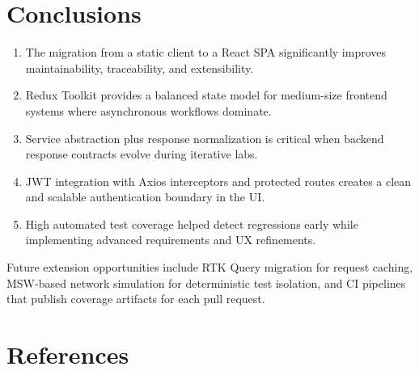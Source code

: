 \documentclass[10pt,a4paper,twocolumn]{article}
\begin{document}
\section{Conclusions}

\begin{resultbox}[title={Key Findings}]
\begin{enumerate}
  \item The migration from a static client to a React SPA significantly improves
	  maintainability, traceability, and extensibility.
  \item Redux Toolkit provides a balanced state model for medium-size frontend
	  systems where asynchronous workflows dominate.
  \item Service abstraction plus response normalization is critical when backend
	  response contracts evolve during iterative labs.
  \item JWT integration with Axios interceptors and protected routes creates a
	  clean and scalable authentication boundary in the UI.
  \item High automated test coverage helped detect regressions early while
	  implementing advanced requirements and UX refinements.
\end{enumerate}
\end{resultbox}

\begin{note}
Future extension opportunities include RTK Query migration for request caching,
MSW-based network simulation for deterministic test isolation, and CI pipelines
that publish coverage artifacts for each pull request.
\end{note}

\section{References}
\end{document}
